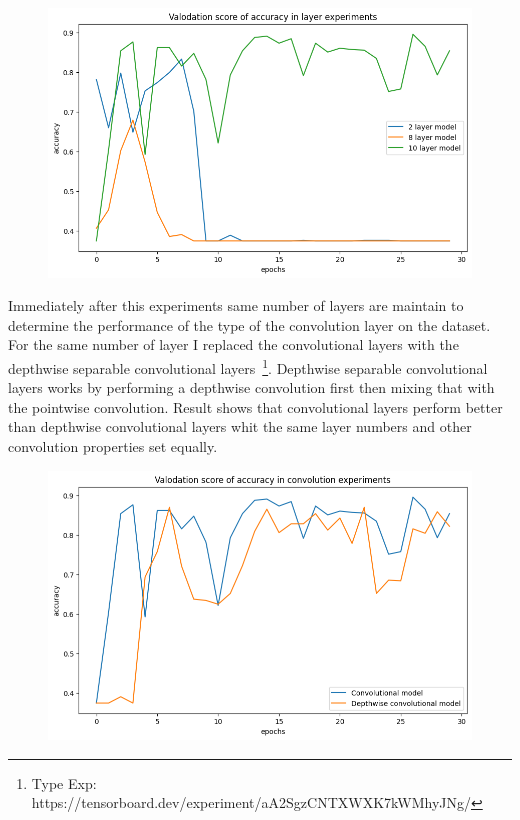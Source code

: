 \begin{figure}[H]
    \centering
    \includegraphics[width=\textwidth]{img/layerexpaccuracy.png}
    \caption{}
    \label{fig:layerexpacc}
\end{figure}

Immediately after this experiments same number of layers are maintain to determine the performance of the type of the convolution layer on the dataset.
For the same number of layer I replaced the convolutional layers with the depthwise separable convolutional layers~\footnote{Type Exp: https://tensorboard.dev/experiment/aA2SgzCNTXWXK7kWMhyJNg/}.
Depthwise separable convolutional layers works by performing a depthwise convolution first then mixing that with the pointwise convolution.
Result shows that convolutional layers perform better than depthwise convolutional layers whit the same layer numbers and other convolution properties set equally.

\begin{figure}[H]
    \centering
    \includegraphics[width=.8\textwidth]{img/deptoconvexpaccuracy.png}
    \caption{}
    \label{fig:depttoconvacc}
\end{figure}

